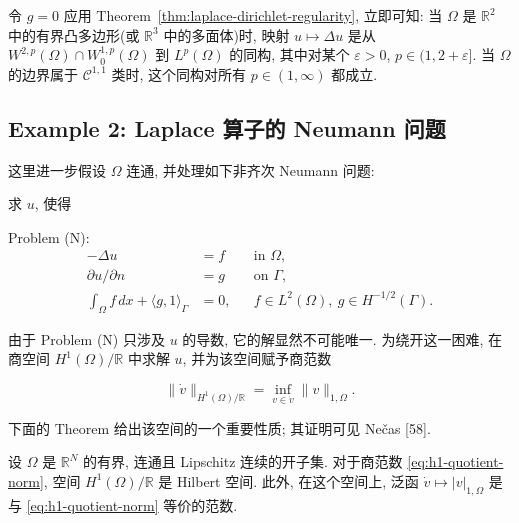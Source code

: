 
\setcounter{statement}{1}
\renewcommand{\theHstatement}{remark.\thesection.\arabic{statement}}
\begin{Remark}\label{rem:laplace-isomorphism-convex-domain}
令 $g=0$ 应用 Theorem~\ref{thm:laplace-dirichlet-regularity}, 立即可知: 当 $\Omega$ 是 $\mathbb R^2$ 中的有界凸多边形(或 $\mathbb R^3$ 中的多面体)时, 映射 $u\mapsto\Delta u$ 是从 $W^{2,p}(\Omega)\cap W_0^{1,p}(\Omega)$ 到 $L^p(\Omega)$ 的同构, 其中对某个 $\varepsilon>0$, $p\in(1,2+\varepsilon]$. 当 $\Omega$ 的边界属于 $\mathcal C^{1,1}$ 类时, 这个同构对所有 $p\in(1,\infty)$ 都成立.
\end{Remark}

\subsection{Example 2: Laplace 算子的 Neumann 问题}\label{subsec:laplace-neumann-example}

这里进一步假设 $\Omega$ 连通, 并处理如下非齐次 Neumann 问题:

求 $u$, 使得

\noindent Problem (N):
\begin{align}
-\Delta u&=f&&\text{in }\Omega,\label{eq:laplace-neumann-pde}\\
\partial u/\partial n&=g&&\text{on }\Gamma,\label{eq:laplace-neumann-boundary}\\
\int_\Omega f\,dx+\langle g,1\rangle_\Gamma&=0,
&& f\in L^2(\Omega),\ g\in H^{-1/2}(\Gamma).\label{eq:laplace-neumann-compatibility}
\end{align}

由于 Problem (N) 只涉及 $u$ 的导数, 它的解显然不可能唯一. 为绕开这一困难, 在商空间 $H^1(\Omega)/\mathbb R$ 中求解 $u$, 并为该空间赋予商范数

\begin{equation}\label{eq:h1-quotient-norm}
\|\dot v\|_{H^1(\Omega)/\mathbb R}=\inf_{v\in\dot v}\|v\|_{1,\Omega}.
\end{equation}

下面的 Theorem 给出该空间的一个重要性质; 其证明可见 Nečas [58].

\setcounter{statement}{8}
\renewcommand{\theHstatement}{theorem.\thesection.\arabic{statement}}
\begin{Theorem}\label{thm:h1-quotient-hilbert}
设 $\Omega$ 是 $\mathbb R^N$ 的有界, 连通且 Lipschitz 连续的开子集. 对于商范数
\eqref{eq:h1-quotient-norm}, 空间 $H^1(\Omega)/\mathbb R$ 是 Hilbert 空间. 此外, 在这个空间上,
泛函 $\dot v\mapsto|v|_{1,\Omega}$ 是与 \eqref{eq:h1-quotient-norm} 等价的范数.
\end{Theorem}

